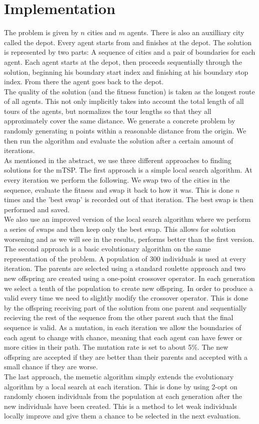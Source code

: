 \documentclass[journal]{IEEEtrancz}
\begin{document}
\section{Implementation}
The problem is given by $n$ cities and $m$ agents. There is also an auxilliary city called the depot. Every agent
starts from and finishes at the depot. The solution is represented by two parts: A sequence of cities and a pair of boundaries for each agent. Each agent starts at the depot, then proceeds sequentially through the solution, beginning his boundary start index and finishing at his boundary stop index. From there the agent goes back to the depot. \\
The quality of the solution (and the fitness function) is taken as the longest route of all agents. This not only implicitly takes into account the total length of all tours of the agents, but normalizes the tour lengths so that they all approximately cover the same distance. We generate a concrete problem by randomly generating n points within a reasonable distance from the origin. We then run the algorithm and evaluate the solution after a certain amount of iterations. \\
As mentioned in the abstract, we use three different approaches to finding solutions for the mTSP.
The first approach is a simple local search algorithm. At every iteration we perform the following. We swap two of the cities in the sequence, evaluate the fitness and swap it back to how it was. This is done $n$ times
and the 'best swap' is recorded out of that iteration. The best swap is then performed and saved. \\
We also use an improved version of the local search algorithm where we perform a series of swaps and then keep only the best swap. This allows for solution worsening and as we will see in the results, performs better than the first version.
The second approach is a basic evolutionary algorithm on the same representation of the problem. 
A population of 300 individuals is used at every iteration. The parents are selected using a standard roulette approach and two new offspring are created using a one-point crossover operator. In each generation we select a tenth of the population to create new offspring. In order to produce a valid  every time we need to slightly modify the crossover operator. This is done by the offspring receiving part of the solution from one parent and sequentially recieving the rest of the sequence from the other parent such that the final sequence is valid. As a mutation, in each iteration we allow the boundaries of each agent to change with chance, meaning that each agent can have fewer or more cities in their path. The mutation rate is set to about 5\%. The new offspring are accepted if they are better than their parents and accepted with a small chance if they are worse. \\
The last approach, the memetic algorithm simply extends the evolutionary algorithm by a local search at each iteration. This is done by using 2-opt on randomly chosen individuals from the population at each generation after the new individuals have been created. This is a method to let weak individuals locally improve and give them a chance to be selected in the next evaluation.
\end{document}
